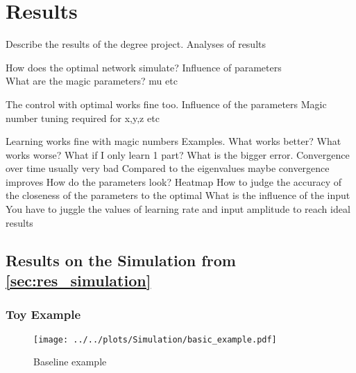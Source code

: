 \chapter{Results}
Describe the results of the degree project.
Analyses of results

How does the optimal network simulate?
Influence of parameters\\
What are the magic parameters? mu etc



The control with optimal works fine too.
Influence of the parameters
Magic number tuning required for x,y,z etc

Learning works fine with magic numbers
Examples.
What works better?
What works worse?
What if I only learn 1 part? What is the bigger error.
Convergence over time usually very bad
Compared to the eigenvalues maybe convergence improves
How do the parameters look? Heatmap
How to judge the accuracy of the closeness of the parameters to the optimal
What is the influence of the input
You have to juggle the values of learning rate and input amplitude to reach ideal results



\section{Results on the Simulation from \cref{sec:res_simulation}}
\subsection{Toy Example}
\begin{figure}[h!]
	\centering
	\centering
	\texttt{[image: ../../plots/Simulation/basic\_example.pdf]}
	\caption{Baseline example}
	\label{fig:sim_res_1}
\end{figure}

